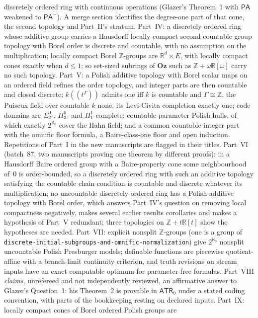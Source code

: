 \documentclass[11pt]{article}
\newcommand{\dir}[1]{\texttt{#1}}
\newcommand{\R}{\mathbb{R}}
\newcommand{\Oz}{\mathbf{Oz}}
\newcommand{\Z}{\mathbb{Z}}
\begin{document}
{discretely ordered ring with continuous operations (Glazer's Theorem~1 with
$\mathsf{PA}$ weakened to $\mathsf{PA}^-$).  A merge section identifies the
degree-one part of that cone, the second topology and Part~II's stratum.
Part~IV: a discretely ordered ring whose additive group carries a
Hausdorff locally compact second-countable group topology with Borel order
is discrete and countable, with no assumption on the multiplication;
locally compact Borel $\Z$-groups are $\R^d\times E$, with locally compact
cones exactly when $d\le1$; so set-sized subrings of $\Oz$ such as
$\Z+\omega\R[\omega]$ carry no such topology.  Part~V: a Polish additive
topology with Borel scalar maps on an ordered field refines the order
topology, and integer parts are then countable and closed discrete;
$k((t^\Gamma))$ admits one iff $k$ is countable and $\Gamma\cong\Z$, the
Puiseux field over countable $k$ none, its Levi-Civita completion exactly
one; code domains are $\Sigma^0_2$-, $\Pi^0_3$- and $\Pi^1_1$-complete;
countable-parameter Polish hulls, of which exactly $2^{\aleph_0}$ cover the
Hahn field; and a common countable integer part with the omnific floor
formula, a Baire-class-one floor and open induction.  Repetitions of
Part~I in the new manuscripts are flagged in their titles.
Part~VI (batch~87, two manuscripts proving one theorem by different
proofs): in a Hausdorff Baire ordered group with a Baire-property cone some
neighbourhood of~$0$ is order-bounded, so a discretely ordered ring with
such an additive topology satisfying the countable chain condition is
countable and discrete whatever its multiplication; no uncountable
discretely ordered ring has a Polish additive topology with Borel order,
which answers Part~IV's question on removing local compactness negatively,
makes several earlier results corollaries and makes a hypothesis of Part~V
redundant; three topologies on $\Z+t\R[t]$ show the hypotheses are needed.
Part~VII: explicit nonsplit $\Z$-groups (one is a group of
\dir{discrete-initial-subgroups-and-omnific-normalization}) give
$2^{\aleph_0}$ nonsplit uncountable Polish Presburger models; definable
functions are piecewise quotient-affine with a branch-limit continuity
criterion, and truth revisions on stream inputs have an exact computable
optimum for parameter-free formulas.  Part~VIII \emph{claims}, unrefereed
and not independently reviewed, an affirmative answer to Glazer's
Question~1: his Theorem~2 is provable in $\mathsf{ATR}_0$ under a stated
coding convention, with parts of the bookkeeping resting on declared
inputs.  Part~IX: locally compact cones of Borel ordered Polish groups are
}
\end{document}
